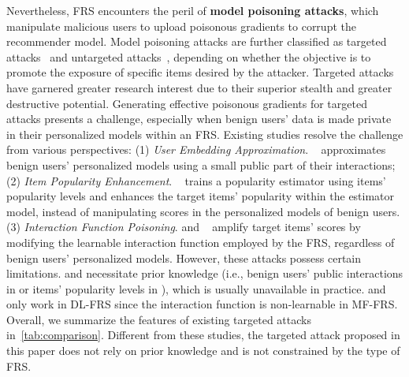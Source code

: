 Nevertheless, FRS encounters the peril of \textbf{model poisoning attacks}, which manipulate malicious users to upload poisonous gradients to corrupt the recommender model.
Model poisoning attacks are further classified as targeted attacks~\cite{fedrecattack,pipattack,a-hum} and untargeted attacks~\cite{FedAttack}, depending on whether the objective is to promote the exposure of specific items desired by the attacker.
Targeted attacks have garnered greater research interest due to their superior stealth and greater destructive potential.
Generating effective poisonous gradients for targeted attacks presents a challenge, especially when benign users' data is made private in their personalized models within an FRS.
Existing studies resolve the challenge from various perspectives:
(1) \emph{User Embedding Approximation}. \FRA{}~\cite{fedrecattack} approximates benign users' personalized models using a small public part of their interactions;
(2) \emph{Item Popularity Enhancement}. \PIP{}~\cite{pipattack} trains a popularity estimator using items' popularity levels and enhances the target items' popularity within the estimator model, instead of manipulating scores in the personalized models of benign users.
(3) \emph{Interaction Function Poisoning}.
\ARA{} and \AHUM{}~\cite{a-hum} amplify target items' scores by modifying the learnable interaction function employed by the FRS, regardless of benign users' personalized models.
%
However, these attacks possess certain limitations.
\FRA{} and \PIP{} necessitate prior knowledge (i.e., benign users' public interactions in \FRA{} or items' popularity levels in \PIP{}), which is usually unavailable in practice.
\ARA{} and \AHUM{} only work in DL-FRS since the interaction function is non-learnable in MF-FRS.
Overall, we summarize the features of existing targeted attacks in~\cref{tab:comparison}{}. Different from these studies, the targeted attack proposed in this paper does not rely on prior knowledge and is not constrained by the type of FRS.

\begin{table}[!htbp]
\end{table}

